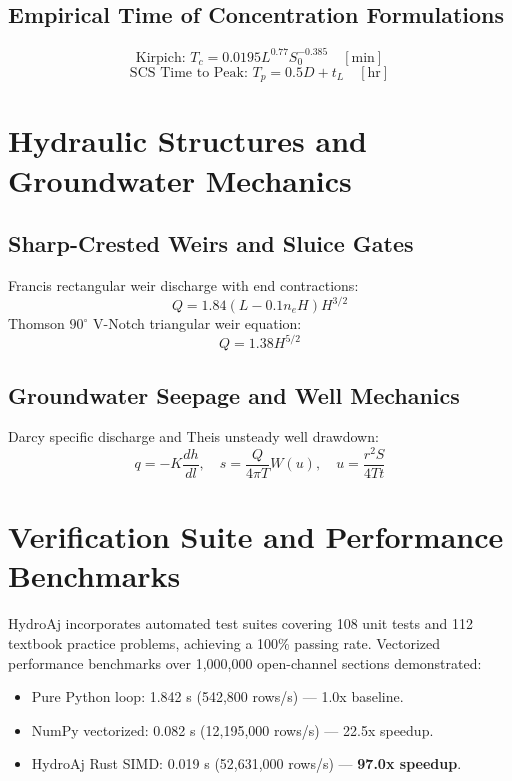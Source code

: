 \documentclass[11pt,a4paper]{article}
\begin{document}
\subsection{Empirical Time of Concentration Formulations}
\begin{equation}
    \text{Kirpich: } T_c = 0.0195 L^{0.77} S_0^{-0.385} \quad [\text{min}]
\end{equation}
\begin{equation}
    \text{SCS Time to Peak: } T_p = 0.5 D + t_L \quad [\text{hr}]
\end{equation}

\section{Hydraulic Structures and Groundwater Mechanics}
\subsection{Sharp-Crested Weirs and Sluice Gates}
Francis rectangular weir discharge with end contractions:
\begin{equation}
    Q = 1.84 (L - 0.1 n_e H) H^{3/2}
\end{equation}
Thomson $90^\circ$ V-Notch triangular weir equation:
\begin{equation}
    Q = 1.38 H^{5/2}
\end{equation}

\subsection{Groundwater Seepage and Well Mechanics}
Darcy specific discharge and Theis unsteady well drawdown:
\begin{equation}
    q = -K \frac{dh}{dl}, \quad s = \frac{Q}{4 \pi T} W(u), \quad u = \frac{r^2 S}{4 T t}
\end{equation}

\section{Verification Suite and Performance Benchmarks}
HydroAj incorporates automated test suites covering 108 unit tests and 112 textbook practice problems, achieving a 100\% passing rate. Vectorized performance benchmarks over 1,000,000 open-channel sections demonstrated:
\begin{itemize}
    \item Pure Python loop: 1.842 s (542,800 rows/s) --- 1.0x baseline.
    \item NumPy vectorized: 0.082 s (12,195,000 rows/s) --- 22.5x speedup.
    \item HydroAj Rust SIMD: 0.019 s (52,631,000 rows/s) --- \textbf{97.0x speedup}.
\end{itemize}
\end{document}
